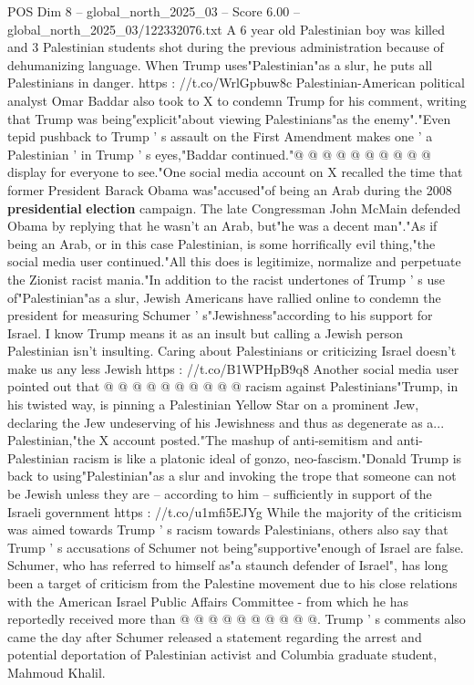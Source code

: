 \begin{textsample}{POS Dim 8 – global\_north\_2025\_03 – Score 6.00 – global\_north\_2025\_03/122332076.txt}
A 6 year old Palestinian boy was killed and 3 Palestinian students shot during the previous administration because of dehumanizing language.
When Trump uses"Palestinian"as a slur, he puts all Palestinians in danger. https : //t.co/WrlGpbuw8c Palestinian-American political analyst Omar Baddar also took to X to condemn Trump for his comment, writing that Trump was being"explicit"about viewing Palestinians"as the enemy"."Even tepid pushback to Trump ' s assault on the First Amendment makes one ' a Palestinian ' in Trump ' s eyes,"Baddar continued."@ @ @ @ @ @ @ @ @ @ display for everyone to see."One social media account on X recalled the time that former President Barack Obama was"accused"of being an Arab during the 2008 \textbf{presidential} \textbf{election} campaign.
The late Congressman John McMain defended Obama by replying that he wasn't an Arab, but"he was a decent man"."As if being an Arab, or in this case Palestinian, is some horrifically evil thing,"the social media user continued."All this does is legitimize, normalize and perpetuate the Zionist racist mania."In addition to the racist undertones of Trump ' s use of"Palestinian"as a slur, Jewish Americans have rallied online to condemn the president for measuring Schumer ' s"Jewishness"according to his support for Israel.
I know Trump means it as an insult but calling a Jewish person Palestinian isn't insulting.
Caring about Palestinians or criticizing Israel doesn't make us any less Jewish https : //t.co/B1WPHpB9q8 Another social media user pointed out that @ @ @ @ @ @ @ @ @ @ racism against Palestinians"Trump, in his twisted way, is pinning a Palestinian Yellow Star on a prominent Jew, declaring the Jew undeserving of his Jewishness and thus as degenerate as a...
Palestinian,"the X account posted."The mashup of anti-semitism and anti-Palestinian racism is like a platonic ideal of gonzo, neo-fascism."Donald Trump is back to using"Palestinian"as a slur and invoking the trope that someone can not be Jewish unless they are -- according to him -- sufficiently in support of the Israeli government https : //t.co/u1mfi5EJYg While the majority of the criticism was aimed towards Trump ' s racism towards Palestinians, others also say that Trump ' s accusations of Schumer not being"supportive"enough of Israel are false.
Schumer, who has referred to himself as"a staunch defender of Israel", has long been a target of criticism from the Palestine movement due to his close relations with the American Israel Public Affairs Committee - from which he has reportedly received more than @ @ @ @ @ @ @ @ @ @.
Trump ' s comments also came the day after Schumer released a statement regarding the arrest and potential deportation of Palestinian activist and Columbia graduate student, Mahmoud Khalil.

\end{textsample}
